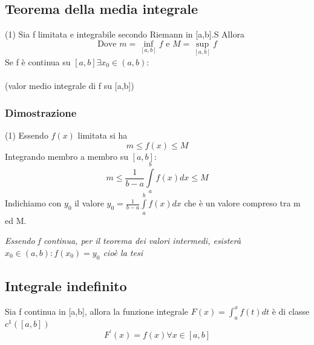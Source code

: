 \subsection{Teorema della media integrale}
\begin{tasks}(1)
	\task Sia f limitata e integrabile secondo Riemann in [a,b].S Allora\\
	 \begin{equation*} \text{Dove } m=\operatorname*{\inf}_{[a,b]} f \text{ e } M=\operatorname*{sup}_{[a,b]} f\end{equation*}
	\task Se f è continua su $[a,b] \exists x_0 \in (a,b)$:\\
	\\(valor medio integrale di f su [a,b])
\end{tasks}
\subsubsection{Dimostrazione}
\begin{tasks}(1)
	\task Essendo $f(x)$ limitata si ha
		\begin{equation*}
			m\leq f(x)\leq M
		\end{equation*}
		Integrando membro a membro su $[a,b]$:
		\begin{equation*}
			m\leq \frac{1}{b-a}\int\limits_a^b f(x)dx\leq M
		\end{equation*}
	\task Indichiamo con $y_0$ il valore $y_0=\frac{1}{b-a}\int\limits_a^b f(x)dx$ che è un valore compreso tra m ed M.
\end{tasks}
\textit{Essendo f continua, per il teorema dei valori intermedi, esisterà $x_0\in (a,b): f(x_0)=y_0$ cioè la tesi}
\subsection{Integrale indefinito}
Sia f continua in [a,b], allora la funzione integrale $F(x)=\int^x_af(t)dt$ è di classe $c^1([a,b])$
\begin{equation*}
	F^\prime (x)=f(x) \forall x \in [a,b]
\end{equation*}
